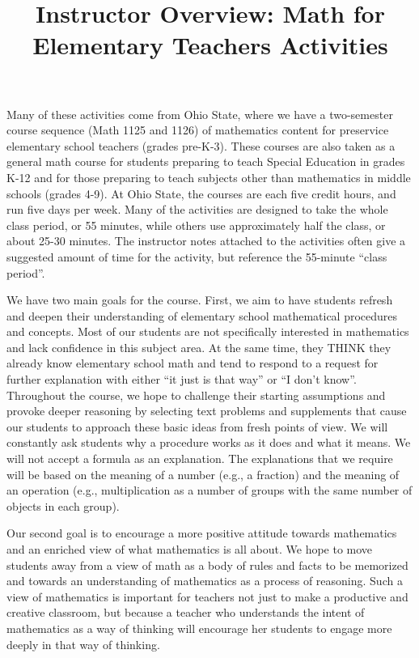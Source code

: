 \documentclass{ximera}
\title{Instructor Overview: Math for Elementary Teachers Activities}
\begin{document}
\begin{abstract}\end{abstract}\maketitle

Many of these activities come from Ohio State, where we have a two-semester course sequence (Math 1125 and 1126) of mathematics content for preservice elementary school teachers (grades pre-K-3).  These courses are also taken as a general math course for students preparing to teach Special Education in grades K-12 and for those preparing to teach subjects other than mathematics in middle schools (grades 4-9).  At Ohio State, the courses are each five credit hours, and run five days per week.  Many of the activities are designed to take the whole class period, or 55 minutes, while others use approximately half the class, or about 25-30 minutes.  The instructor notes attached to the activities often give a suggested amount of time for the activity, but reference the 55-minute ``class period''.

We have two main goals for the course.  First, we aim to have students refresh and deepen their understanding of elementary school mathematical procedures and concepts.  Most of our students are not specifically interested in mathematics and lack confidence in this subject area.  At the same time, they THINK they already know elementary school math and tend to respond to a request for further explanation with either ``it just is that way'' or ``I don't know''.  Throughout the course, we hope to challenge their starting assumptions and provoke deeper reasoning by selecting text problems and supplements that cause our students to approach these basic ideas from fresh points of view.  We will constantly ask students why a procedure works as it does and what it means.  We will not accept a formula as an explanation.  The explanations that we require will be based on the meaning of a number (e.g., a fraction) and the meaning of an operation (e.g., multiplication as a number of groups with the same number of objects in each group).  

Our second goal is to encourage a more positive attitude towards mathematics and an enriched view of what mathematics is all about.  We hope to move students away from a view of math as a body of rules and facts to be memorized and towards an understanding of mathematics as a process of reasoning. Such a view of mathematics is important for teachers not just to make a productive and creative classroom, but because a teacher who understands the intent of mathematics as a way of thinking will encourage her students to engage more deeply in that way of thinking.  
\end{document}
